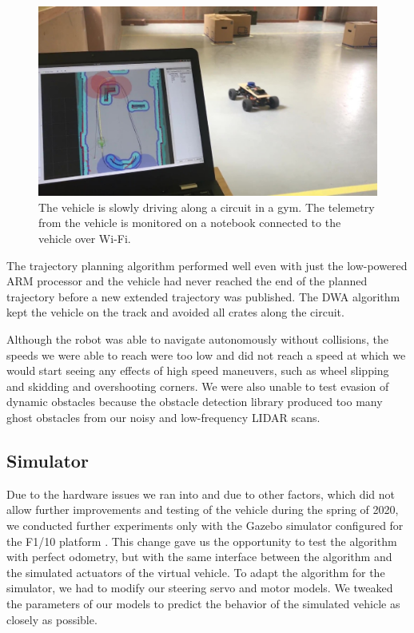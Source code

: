 \begin{figure}
	\centering
	\includegraphics[width=\textwidth]{../img/experiments/real-world-driving.jpg}
	\caption{The vehicle is slowly driving along a circuit in a gym. The telemetry from the vehicle is monitored on a notebook connected to the vehicle over Wi-Fi.}
	\label{fig:real-world-testing-driving}
\end{figure}

The trajectory planning algorithm performed well even with just the low-powered ARM processor and the vehicle had never reached the end of the planned trajectory before a new extended trajectory was published. The \gls{DWA} algorithm kept the vehicle on the track and avoided all crates along the circuit.

Although the robot was able to navigate autonomously without collisions, the speeds we were able to reach were too low and did not reach a speed at which we would start seeing any effects of high speed maneuvers, such as wheel slipping and skidding and overshooting corners. We were also unable to test evasion of dynamic obstacles because the obstacle detection library produced too many ghost obstacles from our noisy and low-frequency \gls*{LIDAR} scans.

\subsection{Simulator}
\label{sec:simulator}
Due to the hardware issues we ran into and due to other factors, which did not allow further improvements and testing of the vehicle during the spring of 2020, we conducted further experiments only with the Gazebo simulator \cite{gazebo} configured for the F1/10 platform \cite{varundev_ros_19}. This change gave us the opportunity to test the algorithm with perfect odometry, but with the same interface between the algorithm and the simulated actuators of the virtual vehicle. To adapt the algorithm for the simulator, we had to modify our steering servo and motor models. We tweaked the parameters of our models to predict the behavior of the simulated vehicle as closely as possible.

